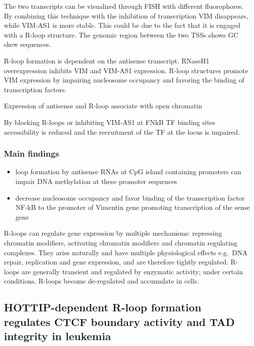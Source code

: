 The two transcripts can be visualized through FISH with different fluorophores. By combining this technique with the inhibition of transcription VIM disappears, while VIM-AS1 is more stable. This could be due to the fact that it is engaged with a R-loop structure. The genomic region between the two TSSs shows GC skew sequences.

R-loop formation is dependent on the antisense transcript. RNaseH1 overexpression inhibits VIM and VIM-AS1 expression. R-loop structures promote VIM expression by impairing nucleosome occupancy and favoring the binding of transcription factors.

Expression of antisense and R-loop associate with open chromatin

By blocking R-loops or inhibiting VIM-AS1 at FNkB TF binding sites accessibility is reduced and the recruitment of the TF at the locus is impaired.

\hypertarget{main-findings}{%
\subsubsection{Main findings}\label{main-findings}}

\begin{itemize}
\tightlist
\item
  loop formation by antisense RNAs at CpG island containing promoters can impair DNA methylation at these promoter sequences
\item
  decrease nucleosome occupancy and favor binding of the transcription factor NF-kB to the promoter of Vimentin gene promoting transcription of the sense gene
\end{itemize}

R-loops can regulate gene expression by multiple mechanisms: repressing chromatin modifiers, activating chromatin modifiers and chromatin regulating complexes. They arise naturally and have multiple physiological effects e.g.~DNA repair, replication and gene expression, and are therefore tightly regulated. R-loops are generally transient and regulated by enzymatic activity; under certain conditions, R-loops become de-regulated and accumulate in cells.

\hypertarget{hottip-dependent-r-loop-formation-regulates-ctcf-boundary-activity-and-tad-integrity-in-leukemia}{%
\subsection{HOTTIP-dependent R-loop formation regulates CTCF boundary activity and TAD integrity in leukemia}\label{hottip-dependent-r-loop-formation-regulates-ctcf-boundary-activity-and-tad-integrity-in-leukemia}}

